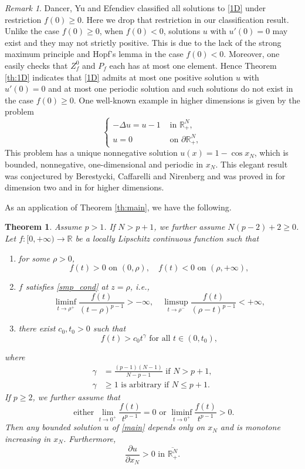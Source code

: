 \documentclass[reqno]{amsart}
\theoremstyle{plain}
\newtheorem{theorem}{Theorem}
\theoremstyle{definition}
\theoremstyle{remark}
\newtheorem{remark}{Remark}
\begin{document}
	\begin{remark}
		Dancer, Yu and Efendiev \cite{MR3058211} classified all solutions to \eqref{1D} under restriction $f(0)\ge0$. Here we drop that restriction in our classification result. Unlike the case $f(0)\ge0$, when $f(0)<0$, solutions $u$ with $u'(0)=0$ may exist and they may not strictly positive. This is due to the lack of the strong maximum principle and Hopf's lemma in the case $f(0)<0$. Moreover, one easily checks that $Z_f^0$ and $P_f$ each has at most one element. Hence Theorem \ref{th:1D} indicates that \eqref{1D} admits at most one positive solution $u$ with $u'(0)=0$ and at most one periodic solution and such solutions do not exist in the case $f(0)\ge0$.
		One well-known example in higher dimensions is given by the problem
		\[
		\begin{cases}
			-\Delta u = u-1 &\text{ in } \mathbb{R}^N_+,\\
			u = 0 &\text{ on } \partial\mathbb{R}^N_+,
		\end{cases}
		\]
		This problem has a unique nonnegative solution $u(x)=1-\cos x_N$, which is bounded, nonnegative, one-dimensional and periodic in $x_N$. This elegant result was conjectured by Berestycki, Caffarelli and Nirenberg \cite{MR1655510} and was proved in \cite{MR3593525} for dimension two and in \cite{MR3550849} for higher dimensions.
	\end{remark}
	
	As an application of Theorem \ref{th:main}, we have the following.
	\begin{theorem}\label{th:sub}
		Assume $p>1$. If $N>p+1$, we further assume $N(p-2)+2\ge0$. Let $f:[0,+\infty)\to\mathbb{R}$ be a locally Lipschitz continuous function such that
		\begin{enumerate}
			\item[(i)] for some $\rho>0$,
			\[
			f(t)>0 \text{ on } (0,\rho),
			\quad f(t)<0 \text{ on } (\rho,+\infty),
			\]
			\item[(ii)] $f$ satisfies \eqref{smp_cond} at $z=\rho$, i.e.,
			\[
			\liminf_{t\to \rho^+} \frac{f(t)}{(t-\rho)^{p-1}} > -\infty,\quad
			\limsup_{t\to \rho^-} \frac{f(t)}{(\rho-t)^{p-1}} < +\infty,
			\]
			\item[(iii)] there exist $c_0,t_0>0$ such that
			\[
			f(t) > c_0 t^\gamma \text{ for all } t \in (0, t_0),
			\]
		\end{enumerate}
		where
		\begin{align*}
			\gamma&=\frac{(p-1)(N-1)}{N-p-1} \text{ if } N>p+1,\\
			\gamma&\ge1 \text{ is arbitrary if } N\le p+1.
		\end{align*}
		If $p\ge2$, we further assume that
		\[
		\text{ either }\lim_{t\to0^+} \frac{f(t)}{t^{p-1}} = 0 \text{ or } \liminf_{t\to0^+} \frac{f(t)}{t^{p-1}} > 0.
		\] 
		Then any bounded solution $u$ of \eqref{main} depends only on $x_N$ and is monotone increasing in $x_N$. Furthermore,
		\[
		\frac{\partial u}{\partial x_N} > 0 \text{ in } \overline{\mathbb{R}^N_+}.
		\]
	\end{theorem}
	
\end{document}
